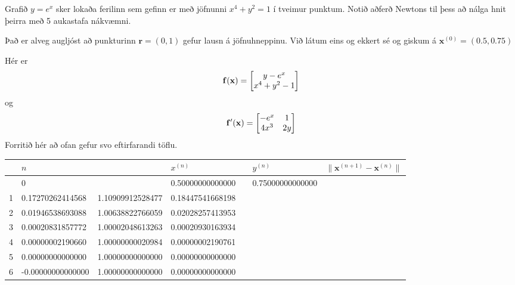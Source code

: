 \documentclass[letterpaper,10pt,icelandic]{sphinxmanual}
\begin{document}
Grafið \(y=e^x\) sker lokaða ferilinn sem gefinn er með jöfnunni
\(x^4+y^2=1\) í tveimur punktum. Notið aðferð Newtons til þess að
nálga hnit þeirra með 5 aukastafa nákvæmni.

Það er alveg augljóst að punkturinn \({\mathbf r}=(0,1)\) gefur
lausn á jöfnuhneppinu. Við látum eins og ekkert sé og giskum á
\({\mathbf x}^{(0)}=(0.5,0.75)\)

Hér er
\begin{gather}
\begin{split}{\bf f}({\bf x}) = \begin{bmatrix}
y - e^x\\
x^4+y^2-1 \end{bmatrix}\end{split}\notag
\end{gather}
og
\begin{gather}
\begin{split}{\bf f'}({\bf x}) = \begin{bmatrix}
-e^x & 1 \\
4x^3 & 2y \end{bmatrix}\end{split}\notag
\end{gather}
Forritið hér að ofan gefur svo eftirfarandi töflu.

\begin{tabular}{|l|l|l|l|l|l|l|}
\hline
 & \textsf{\relax 
\(n\)
} &  & \textsf{\relax 
\(x^{(n)}\)
} &  & \textsf{\relax 
\(y^{(n)}\)
} & \textsf{\relax 
\(\|{\mathbf x}^{(n+1)}-{\mathbf x}^{(n)}\|\)
}\\
\hline & 
0
 &  & 
0.50000000000000
 &  & 
0.75000000000000
 & \\
\hline
1
 & 
0.17270262414568
 & 
1.10909912528477
 & 
0.18447541668198
\\
\hline
2
 & 
0.01946538693088
 & 
1.00638822766059
 & 
0.02028257413953
\\
\hline
3
 & 
0.00020831857772
 & 
1.00002048613263
 & 
0.00020930163934
\\
\hline
4
 & 
0.00000002190660
 & 
1.00000000020984
 & 
0.00000002190761
\\
\hline
5
 & 
0.00000000000000
 & 
1.00000000000000
 & 
0.00000000000000
\\
\hline
6
 & 
-0.00000000000000
 & 
1.00000000000000
 & 
0.00000000000000
\\

\hline
\end{tabular}
\end{document}
